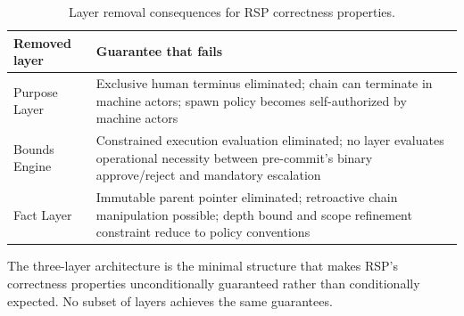 \begin{table}[h]
\centering
\begin{tabular}{p{3.2cm} p{5.4cm}}
\toprule
\textbf{Removed layer} & \textbf{Guarantee that fails} \\
\midrule
Purpose Layer          & Exclusive human terminus eliminated; chain can terminate in machine actors; spawn policy becomes self-authorized by machine actors \\
Bounds Engine          & Constrained execution evaluation eliminated; no layer evaluates operational necessity between pre-commit's binary approve/reject and mandatory escalation \\
Fact Layer             & Immutable parent pointer eliminated; retroactive chain manipulation possible; depth bound and scope refinement constraint reduce to policy conventions \\
\bottomrule
\end{tabular}
\caption{Layer removal consequences for RSP correctness properties.}
\label{tab:layer-minimality}
\end{table}

The three-layer architecture is the minimal structure that makes RSP's correctness properties unconditionally guaranteed rather than conditionally expected. No subset of layers achieves the same guarantees.
